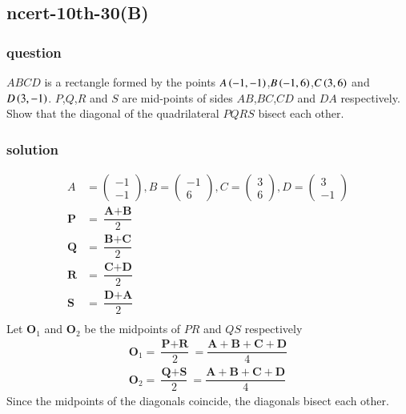 \documentclass[journal,12pt,onecolumn]{IEEEtran}
\theoremstyle{remark}
\begin{document}
\subsection{ncert-10th-30(B)}
\subsubsection{question}
$ABCD$ is a rectangle formed by the points $A\left(-1,-1\right)$,$B\left(-1,6\right)$,$C\left(3,6\right)$ and $D\left(3,-1\right)$. $P$,$Q$,$R$ and $S$ are mid-points of sides $AB$,$BC$,$CD$ and $DA$ respectively. Show that the diagonal of the quadrilateral $PQRS$ bisect each other. 
\subsubsection{solution}
\begin{align}
    A &= \begin{pmatrix}
        -1\\
        -1
    \end{pmatrix},
    B = \begin{pmatrix}
        -1\\
        6
    \end{pmatrix},
    C = \begin{pmatrix}
        3\\
        6
    \end{pmatrix},
    D = \begin{pmatrix}
        3\\
        -1
    \end{pmatrix}\\
    \textbf{P}&=\dfrac{\textbf{A}+\textbf{B}}{2}\\
        \textbf{Q}&=\dfrac{\textbf{B}+\textbf{C}}{2}\\
    \textbf{R}&=\dfrac{\textbf{C}+\textbf{D}}{2}\\
    \textbf{S}&=\dfrac{\textbf{D}+\textbf{A}}{2}\\
    \end{align}
Let $\textbf{O}_1$ and $\textbf{O}_2$ be the midpoints of $PR$ and $QS$ respectively
\begin{align}
    \textbf{O}_1 = \dfrac{\textbf{P}+\textbf{R}}{2}=\dfrac{\textbf{A}+\textbf{B}+\textbf{C}+\textbf{D}}{4}\\
      \textbf{O}_2 = \dfrac{\textbf{Q}+\textbf{S}}{2}=\dfrac{\textbf{A}+\textbf{B}+\textbf{C}+\textbf{D}}{4}
\end{align}
Since the midpoints of the diagonals coincide, the diagonals bisect each other. 
\end{document}
